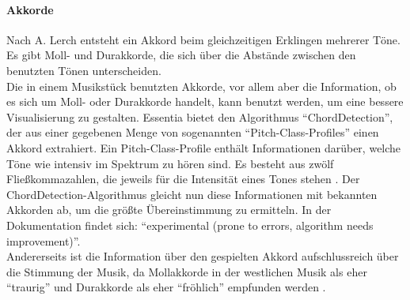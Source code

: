 \documentclass[11pt,a4paper]{article}
\begin{document}
\paragraph{Akkorde}
Nach A. Lerch \cite[S. 86]{lerch2012introduction} entsteht ein Akkord beim gleichzeitigen Erklingen mehrerer Töne. Es gibt Moll- und Durakkorde, die sich über die Abstände zwischen den benutzten Tönen unterscheiden.\\
Die in einem Musikstück benutzten Akkorde, vor allem aber die Information, ob es sich um Moll- oder Durakkorde handelt, kann benutzt werden, um eine bessere Visualisierung zu gestalten. Essentia bietet den Algorithmus ``ChordDetection'', der aus einer gegebenen Menge von sogenannten ``Pitch-Class-Profiles'' einen Akkord extrahiert. Ein Pitch-Class-Profile enthält Informationen darüber, welche Töne wie intensiv im Spektrum zu hören sind. Es besteht aus zwölf Fließkommazahlen, die jeweils für die Intensität eines Tones stehen \cite{e6fe2ea94b8d448139e05e3d36c0ffd5e82905dc87f719492ff3872650c667d9}. Der ChordDetection-Algorithmus gleicht nun diese Informationen mit bekannten Akkorden ab, um die größte Übereinstimmung zu ermitteln. In der Dokumentation findet sich: ``experimental (prone to errors, algorithm needs improvement)''\cite{EssentiaChordDetection}.\\
Andererseits ist die Information über den gespielten Akkord aufschlussreich über die Stimmung der Musik, da Mollakkorde in der westlichen Musik als eher ``traurig'' und Durakkorde als eher ``fröhlich'' empfunden werden \cite{dalla2001developmental}.
\end{document}
